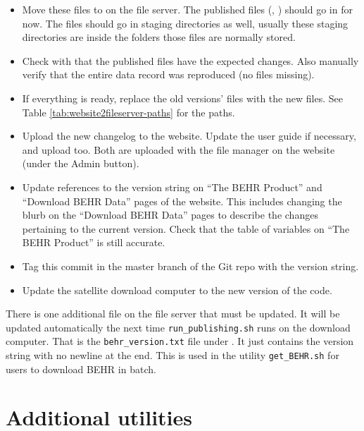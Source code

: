 \documentclass[12pt]{article}
\begin{document}
\begin{itemize}
\item Move these files to  on the  file server. The published files (, ) should go in  for now.  The  files should go in staging directories as well, usually these staging directories are inside the folders those  files are normally stored.

\item Check with  that the published files have the expected changes. Also manually verify that the entire data record was reproduced (no files missing).

\item If everything is ready, replace the old versions' files with the new files.  See Table \ref{tab:website2fileserver-paths} for the paths.

\item Upload the new changelog to the website. Update the user guide if necessary, and upload too. Both are uploaded with the file manager on the website (under the Admin button).

\item Update references to the version string on ``The BEHR Product'' and ``Download BEHR Data'' pages of the website.  This includes changing the blurb on the ``Download BEHR Data'' pages to describe the changes pertaining to the current version.  Check that the table of variables on ``The BEHR Product'' is still accurate.

\item Tag this commit in the master branch of the Git repo with the version string.

\item Update the satellite download computer to the new version of the code.
\end{itemize}
		
	There is one additional file on the file server that must be updated.  It will be updated automatically the next time \lstinline$run_publishing.sh$ runs on the download computer. That is the \lstinline$behr_version.txt$ file under . It just contains the version string with no newline at the end.  This is used in the utility \lstinline$get_BEHR.sh$ for users to download BEHR in batch.	
	
\section{Additional utilities}
\end{document}
